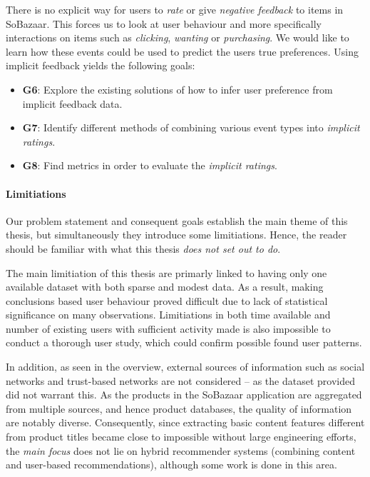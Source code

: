 There is no explicit way for users to \textit{rate} or give \textit{negative
feedback} to items in SoBazaar. This forces us to look at user behaviour and
more specifically interactions on items such as \textit{clicking},
\textit{wanting} or \textit{purchasing}. We would like to learn how these
events could be used to predict the users true preferences. Using implicit
feedback yields the following goals:

\begin{itemize}
  \item \textbf{G6}: Explore the existing solutions of how to infer user preference from
  implicit feedback data.
  \item \textbf{G7}: Identify different methods of combining various event types into
  \emph{implicit ratings}.
  \item \textbf{G8}: Find metrics in order to evaluate the \emph{implicit ratings}.
\end{itemize}

\paragraph{Limitiations} Our problem statement and consequent goals establish
the main theme of this thesis, but simultaneously they introduce some
limitiations. Hence, the reader should be familiar with what this thesis
\textit{does not set out to do}.

The main limitiation of this thesis are primarly linked to having only one
available dataset with both sparse and modest data. As a result, making
conclusions based user behaviour proved difficult due to lack of statistical
significance on many observations. Limitiations in both time available and
number of existing users with sufficient activity made is also impossible to
conduct a thorough user study, which could confirm possible found user
patterns.

In addition, as seen in the overview, external sources of information such as
social networks and trust-based networks are not considered -- as the dataset
provided did not warrant this. As the products in the SoBazaar application are
aggregated from multiple sources, and hence product databases, the quality of
information are notably diverse. Consequently, since extracting basic content
features different from product titles became close to impossible without large
engineering efforts, the \textit{main focus} does not lie on hybrid recommender
systems (combining content and user-based recommendations), although some work
is done in this area.

